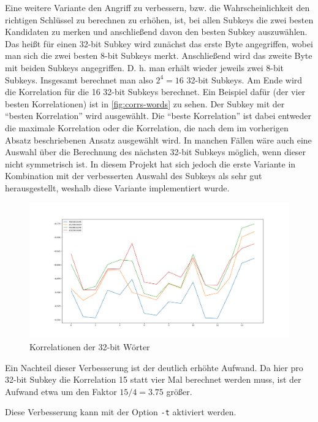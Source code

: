 \documentclass[a4paper,ngerman]{scrreprt}
\begin{document}
Eine weitere Variante den Angriff zu verbessern, bzw. die Wahrscheinlichkeit den
richtigen Schlüssel zu berechnen zu erhöhen, ist, bei allen Subkeys die zwei
besten Kandidaten zu merken und anschließend davon den besten Subkey
auszuwählen. Das heißt für einen 32-bit Subkey wird zunächst das erste Byte
angegriffen, wobei man sich die zwei besten 8-bit Subkeys merkt. Anschließend
wird das zweite Byte mit beiden Subkeys angegriffen. D. h. man erhält wieder
jeweils zwei 8-bit Subkeys. Insgesamt berechnet man also $2^4 = 16$ 32-bit
Subkeys. Am Ende wird die Korrelation für die 16 32-bit Subkeys berechnet. Ein
Beispiel dafür (der vier besten Korrelationen) ist in \autoref{fig:corrs-words}
zu sehen. Der Subkey mit der ``besten Korrelation'' wird ausgewählt. Die ``beste
Korrelation'' ist dabei entweder die maximale Korrelation oder die Korrelation,
die nach dem im vorherigen Absatz beschriebenen Ansatz ausgewählt wird. In
manchen Fällen wäre auch eine Auswahl über die Berechnung des nächsten 32-bit
Subkeys möglich, wenn dieser nicht symmetrisch ist. In diesem Projekt hat sich
jedoch die erste Variante in Kombination mit der verbesserten Auswahl des
Subkeys als sehr gut herausgestellt, weshalb diese Variante implementiert wurde.

\begin{figure}[H]
    \caption{Korrelationen der 32-bit Wörter}
    \label{fig:corrs-words}

    \includegraphics[width=\textwidth]{img/corrs_subkey_word.png}
\end{figure}

Ein Nachteil dieser Verbesserung ist der deutlich erhöhte Aufwand. Da hier pro
32-bit Subkey die Korrelation 15 statt vier Mal berechnet werden muss, ist der
Aufwand etwa um den Faktor $15/4 = 3.75$ größer.

Diese Verbesserung kann mit der Option \verb+-t+ aktiviert werden.
\end{document}
